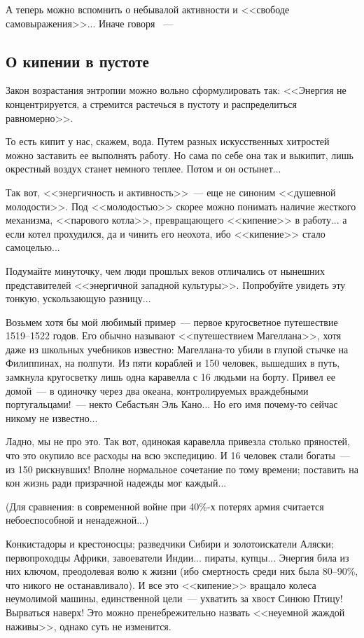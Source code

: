 \documentclass{scrbook}
\newcommand{\flqq}{<<}
\newcommand{\frqq}{>>}
\newcommand{\mdash}{~--- }
\newcommand{\ndash}{--}
\newcommand{\essaysection}[1]{\subsection*{#1}\nopagebreak}
\begin{document}
А теперь можно вспомнить о небывалой активности и {\flqq}свободе самовыражения{\frqq}... Иначе говоря {\mdash}

\essaysection{О кипении в пустоте}

Закон возрастания энтропии можно вольно сформулировать так: {\flqq}Энергия не концентрируется, а стремится растечься в пустоту и распределиться равномерно{\frqq}.

То есть кипит у нас, скажем, вода. Путем разных искусственных хитростей можно заставить ее выполнять работу. Но сама по себе она так и выкипит, лишь окрестный воздух станет немного теплее. Потом и он остынет...

Так вот, {\flqq}энергичность и активность{\frqq}{\mdash}еще не синоним {\flqq}душевной молодости{\frqq}. Под {\flqq}молодостью{\frqq} скорее можно понимать наличие жесткого механизма, {\flqq}парового котла{\frqq}, превращающего {\flqq}кипение{\frqq} в работу... а если котел прохудился, да и чинить его неохота, ибо {\flqq}кипение{\frqq} стало самоцелью...

Подумайте минуточку, чем люди прошлых веков отличались от нынешних представителей {\flqq}энергичной западной культуры{\frqq}. Попробуйте увидеть эту тонкую, ускользающую разницу...

Возьмем хотя бы мой любимый пример{\mdash}первое кругосветное путешествие 1519{\ndash}1522 годов. Его обычно называют {\flqq}путешествием Магеллана{\frqq}, хотя даже из школьных учебников известно: Магеллана-то убили в глупой стычке на Филиппинах, на полпути. Из пяти кораблей и 150 человек, вышедших в путь, замкнула кругосветку лишь одна каравелла с 16 людьми на борту. Привел ее домой{\mdash}в одиночку через два океана, контролируемых враждебными португальцами!{\mdash}некто Себастьян Эль Кано... Но его имя почему-то сейчас никому не известно...

Ладно, мы не про это. Так вот, одинокая каравелла привезла столько пряностей, что это окупило все расходы на всю экспедицию. И 16 человек стали богаты{\mdash}из 150 рискнувших! Вполне нормальное сочетание по тому времени; поставить на кон жизнь ради призрачной надежды мог каждый...

(Для сравнения: в современной войне при 40\%-х потерях армия считается небоеспособной и ненадежной...)

Конкистадоры и крестоносцы; разведчики Сибири и золотоискатели Аляски; первопроходцы Африки, завоеватели Индии... пираты, купцы... Энергия била из них ключом, преодолевая волю к жизни (ибо смертность среди них была 80{\ndash}90\%, что никого не останавливало). И все это {\flqq}кипение{\frqq} вращало колеса неумолимой машины, единственной цели{\mdash}ухватить за хвост Синюю Птицу! Вырваться наверх! Это можно пренебрежительно назвать {\flqq}неуемной жаждой наживы{\frqq}, однако суть не изменится.
\end{document}
